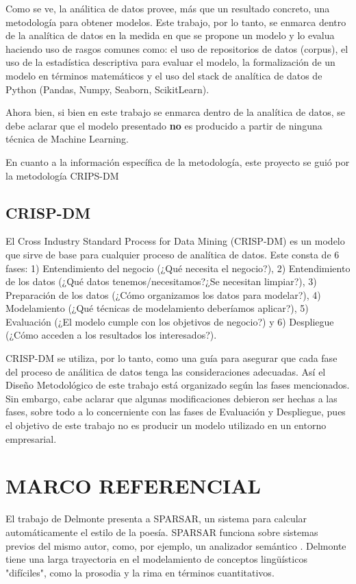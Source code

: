 \documentclass[12pt,letterpaper,twoside]{article}
\begin{document}
Como se ve, la análitica de datos provee, más que un resultado
concreto, una metodología para obtener modelos. Este trabajo,
por lo tanto, se enmarca dentro de la analítica de datos
en la medida en que se propone un modelo y lo evalua haciendo
uso de rasgos comunes como: el uso de repositorios de datos
(corpus), el uso de la estadística descriptiva para evaluar
el modelo, la formalización de un modelo en términos matemáticos
y el uso del stack de analítica de datos de Python (Pandas, Numpy,
Seaborn, ScikitLearn).

Ahora bien, si bien en este trabajo se enmarca dentro de la
analítica de datos, se debe aclarar que el modelo presentado
\textbf{no} es producido a partir de ninguna técnica  de Machine Learning.

En cuanto a la información específica de la metodología, este
proyecto se guió por la metodología CRIPS-DM

\subsection{CRISP-DM}
\label{sec:org9492e17}
El Cross Industry Standard Process for Data Mining (CRISP-DM) es
un modelo que sirve de base para cualquier proceso de analítica de
datos. Este consta de 6 fases: 1) Entendimiento del negocio (¿Qué
necesita el negocio?), 2) Entendimiento de los datos (¿Qué datos
tenemos/necesitamos?¿Se necesitan limpiar?), 3) Preparación de los
datos (¿Cómo organizamos los datos para modelar?), 4) Modelamiento
(¿Qué técnicas de modelamiento deberíamos aplicar?), 5) Evaluación
(¿El modelo cumple con los objetivos de negocio?) y 6) Despliegue
(¿Cómo acceden a los resultados los interesados?).

CRISP-DM se utiliza, por lo tanto, como una guía para
asegurar que cada fase del proceso de análitica de datos
tenga las consideraciones adecuadas. Así el Diseño Metodológico
de este trabajo está organizado según las fases mencionados.
Sin embargo, cabe aclarar que algunas modificaciones debieron
ser hechas a las fases, sobre todo a lo concerniente con las
fases de Evaluación y Despliegue, pues el objetivo de este
trabajo no es producir un modelo utilizado en un entorno empresarial.




\section{MARCO REFERENCIAL}
\label{sec:org5e1bcf5}

El trabajo de Delmonte \cite{delmonte2013computing} presenta a
SPARSAR, un sistema para calcular automáticamente el estilo de la
poesía. SPARSAR funciona sobre sistemas previos del mismo autor, como,
por ejemplo, un analizador semántico \cite{delmonte2005venses}.
Delmonte tiene una larga trayectoria en el modelamiento de conceptos
lingüísticos "difíciles", como la prosodia y la rima en términos
cuantitativos.
\end{document}
